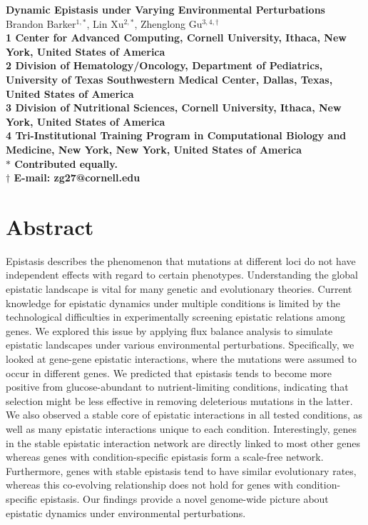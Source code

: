 \documentclass[10pt]{article}
\date{}
\begin{document}
\begin{flushleft}
{\Large
\textbf{Dynamic Epistasis under Varying Environmental Perturbations}
}
\\
Brandon Barker$^{1,\ast}$, 
Lin Xu$^{2,\ast}$, 
Zhenglong Gu$^{3,4,\dag}$
\\
\bf{1} Center for Advanced Computing, Cornell University, Ithaca, New
York, United States of America
\\
\bf{2} Division of Hematology/Oncology, Department of Pediatrics,
University of Texas Southwestern Medical Center, Dallas, Texas, United
States of America
\\
\bf{3} Division of Nutritional Sciences, Cornell University, Ithaca,
New York, United States of America
\\
\bf{4} Tri-Institutional Training Program in Computational Biology and
Medicine, New York, New York, United States of America
\\
$\ast$ Contributed equally. 
\\
$\dag$ E-mail: zg27@cornell.edu
\end{flushleft}

\section*{Abstract}

Epistasis describes the phenomenon that mutations at different loci do
not have independent effects with regard to certain
phenotypes. Understanding the global epistatic landscape is vital for
many genetic and evolutionary theories. Current knowledge for
epistatic dynamics under multiple conditions is limited by the
technological difficulties in experimentally screening epistatic
relations among genes. We explored this issue by applying flux balance
analysis to simulate epistatic landscapes under various
environmental perturbations. Specifically, we looked at gene-gene
epistatic interactions, where the mutations were assumed to occur in
different genes. We predicted that epistasis tends to become more
positive from glucose-abundant to nutrient-limiting conditions,
indicating that selection might be less effective in removing
deleterious mutations in the latter. We also observed a stable core of
epistatic interactions in all tested conditions, as well as many
epistatic interactions unique to each condition. Interestingly, genes
in the stable epistatic interaction network are directly linked to
most other genes whereas genes with condition-specific epistasis form
a scale-free network. Furthermore, genes with stable epistasis tend to
have similar evolutionary rates, whereas this co-evolving relationship
does not hold for genes with condition-specific epistasis. Our
findings provide a novel genome-wide picture about epistatic dynamics
under environmental perturbations.
\end{document}
